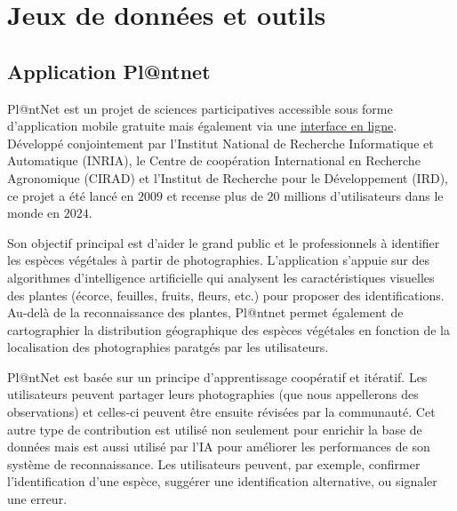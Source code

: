 \documentclass[a4paper,12pt]{article}
\begin{document}
\section{Jeux de données et outils}


\subsection{Application Pl@ntnet}

Pl@ntNet est un projet de sciences participatives accessible sous forme d’application mobile gratuite mais également via une \href{https://identify.plantnet.org/fr}{interface en ligne}. Développé conjointement par l'Institut National de Recherche Informatique et Automatique (INRIA), le Centre de coopération International en Recherche Agronomique (CIRAD) et l'Institut de Recherche pour le Développement (IRD), ce projet a été lancé en $2009$ et recense plus de $20$ millions d'utilisateurs dans le monde en $2024$. 

\vspace{0.2cm}

Son objectif principal est d'aider le grand public et le professionnels à identifier les espèces végétales à partir de photographies. L'application s'appuie sur des algorithmes d'intelligence artificielle qui analysent les caractéristiques visuelles des plantes (écorce, feuilles, fruits, fleurs, etc.) pour proposer des identifications. Au-delà de la reconnaissance des plantes, Pl@ntnet permet également de cartographier la distribution géographique des espèces végétales en fonction de la localisation des photographies paratgés par les utilisateurs.

\vspace{0.2cm}

Pl@ntNet est basée sur un principe d’apprentissage coopératif et itératif. Les utilisateurs peuvent partager leurs photographies (que nous appellerons des observations) et celles-ci peuvent être ensuite révisées par la communauté. Cet autre type de contribution est utilisé non seulement pour enrichir la base de données mais est aussi utilisé par l’IA pour améliorer les performances de son système de reconnaissance. Les utilisateurs peuvent, par exemple, confirmer l'identification d'une espèce, suggérer une identification alternative, ou signaler une erreur.

\vspace{0.2cm}
\end{document}
